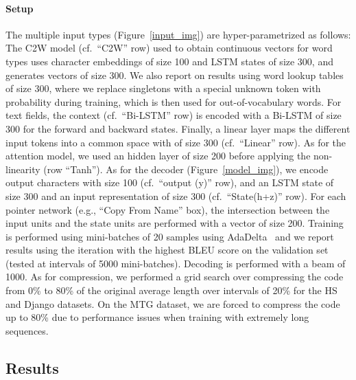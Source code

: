 \documentclass[11pt]{article}
\begin{document}
\paragraph{Setup} The multiple input types (Figure~\ref{input_img}) are
hyper-parametrized as follows: The C2W model (cf.~``C2W'' row) used to obtain
continuous vectors for word types uses character embeddings of size 100 and
LSTM states of size 300, and generates vectors of size 300. We also
report on results using word lookup tables of size 300, where we replace
singletons with a special unknown token with probability  during training, which is then used for out-of-vocabulary words.
For text fields, the
context (cf.~``Bi-LSTM'' row) is encoded with a Bi-LSTM of size 300 for the
forward and backward states. Finally, a linear layer maps the different input tokens
into a common space with of size 300 (cf.~``Linear'' row). As for the attention model,
we used an hidden layer of size 200 before applying the non-linearity (row
``Tanh''). As for the decoder (Figure~\ref{model_img}), we encode
output characters with size 100 (cf.~``output (y)'' row), and an LSTM state of size 300
and an input representation of size 300 (cf.~``State(h+z)'' row). For each pointer network (e.g., ``Copy From Name'' box),
the intersection
between the input units and the state units are performed with a vector of size 200.
Training is performed using mini-batches of 20 samples using
AdaDelta~\cite{DBLP:journals/corr/abs-1212-5701} and we report results using the
iteration with the highest BLEU score on the validation set (tested at intervals
of 5000 mini-batches). Decoding is performed with a beam of 1000.
As for compression, we performed a grid search over
compressing the code from 0\% to 80\% of the original average length over
intervals of 20\% for the HS and Django datasets. On the MTG dataset, we are forced to
compress the code up to 80\% due to performance issues when training with extremely long sequences.

\subsection{Results}
\end{document}
